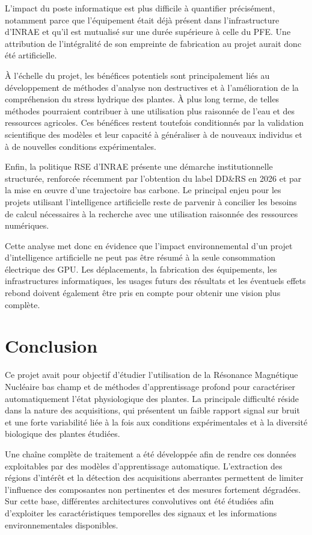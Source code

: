 \documentclass[12pt,a4paper,twoside]{article}
\begin{document}
L'impact du poste informatique est plus difficile à quantifier précisément, notamment parce que l'équipement était déjà présent dans l'infrastructure d'INRAE et qu'il est mutualisé sur une durée supérieure à celle du PFE. Une attribution de l'intégralité de son empreinte de fabrication au projet aurait donc été artificielle.

À l'échelle du projet, les bénéfices potentiels sont principalement liés au développement de méthodes d'analyse non destructives et à l'amélioration de la compréhension du stress hydrique des plantes. À plus long terme, de telles méthodes pourraient contribuer à une utilisation plus raisonnée de l'eau et des ressources agricoles. Ces bénéfices restent toutefois conditionnés par la validation scientifique des modèles et leur capacité à généraliser à de nouveaux individus et à de nouvelles conditions expérimentales.

Enfin, la politique RSE d'INRAE présente une démarche institutionnelle structurée, renforcée récemment par l'obtention du label DD\&RS en 2026 et par la mise en œuvre d'une trajectoire bas carbone. Le principal enjeu pour les projets utilisant l'intelligence artificielle reste de parvenir à concilier les besoins de calcul nécessaires à la recherche avec une utilisation raisonnée des ressources numériques.

Cette analyse met donc en évidence que l'impact environnemental d'un projet d'intelligence artificielle ne peut pas être résumé à la seule consommation électrique des GPU. Les déplacements, la fabrication des équipements, les infrastructures informatiques, les usages futurs des résultats et les éventuels effets rebond doivent également être pris en compte pour obtenir une vision plus complète.



\section{Conclusion}
\label{sec:conclusion}

Ce projet avait pour objectif d'étudier l'utilisation de la Résonance
Magnétique Nucléaire bas champ et de méthodes d'apprentissage profond pour
caractériser automatiquement l'état physiologique des plantes. La principale
difficulté réside dans la nature des acquisitions, qui présentent un faible
rapport signal sur bruit et une forte variabilité liée à la fois aux conditions
expérimentales et à la diversité biologique des plantes étudiées.

Une chaîne complète de traitement a été développée afin de rendre ces données
exploitables par des modèles d'apprentissage automatique. L'extraction des
régions d'intérêt et la détection des acquisitions aberrantes permettent de
limiter l'influence des composantes non pertinentes et des mesures fortement
dégradées. Sur cette base, différentes architectures convolutives ont été
étudiées afin d'exploiter les caractéristiques temporelles des signaux et les
informations environnementales disponibles.
\end{document}
